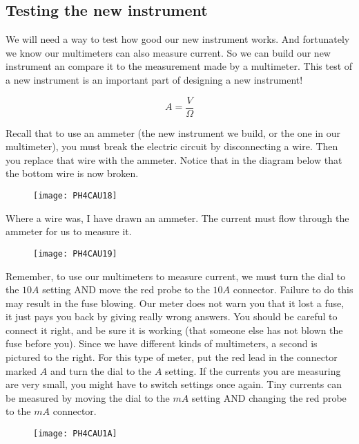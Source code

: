 \subsection{Testing the new instrument}

We will need a way to test how good our new instrument works. And fortunately we know our multimeters can also measure current. So we can build our new instrument an compare it to the measurement made by a multimeter. This test of a new instrument is an important part of designing a new instrument!

\begin{equation*}
	\unit{A}=\frac{\unit{V}}{\unit{\Omega}}
\end{equation*}

Recall that to use an ammeter (the new instrument we build, or the one in our multimeter), you must break the electric circuit by disconnecting a wire. Then you replace that wire with the ammeter. Notice that in the diagram below that the bottom wire is now broken. 

\begin{figure}[h!]
	\centering
     \texttt{[image: PH4CAU18]}
\end{figure}

Where a wire was, I have drawn an ammeter. The current must flow through the ammeter for us to measure it.

\begin{figure}[h!]
	\centering
    \texttt{[image: PH4CAU19]}
\end{figure} 

Remember, to use our multimeters to measure current, we must turn the dial to the $10\unit{A}$ setting AND move the red probe to the $10\unit{A}$ connector. Failure to do this may result in the fuse blowing. Our meter does not warn you that it lost a fuse, it just pays you back by giving really wrong answers. You should be careful to connect it right, and be sure it is working (that someone else has not blown the fuse before you). Since we have different kinds of multimeters, a
second is pictured to the right. For this type of meter, put the red lead in the connector marked $A$ and turn the dial to the $A$ setting. If the currents you are measuring are very small, you might have to switch settings once again. Tiny currents can be measured by moving the dial to the $\unit{mA}$ setting AND changing the red probe to the $\unit{mA}$ connector.

\begin{figure}[h!]
	\centering
    \texttt{[image: PH4CAU1A]}
\end{figure}

